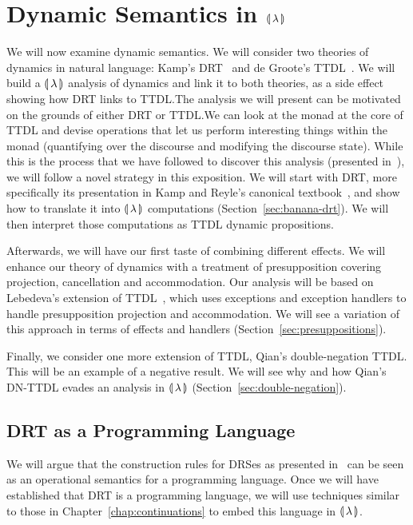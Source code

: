 \chapter{Dynamic Semantics in \texorpdfstring{$\llparenthesis \, \lambda \, \rrparenthesis$}{Our Calculus}}
\label{chap:dynamic-semantics}

We will now examine dynamic semantics. We will consider two theories of
dynamics in natural language: Kamp's DRT~\cite{kamp1993discourse} and de
Groote's TTDL~\cite{de2006towards}. We will build a $\llparenthesis \, \lambda \, \rrparenthesis$
analysis of dynamics and link it to both theories, as a side effect showing
how DRT links to TTDL.\@ The analysis we will present can be motivated on
the grounds of either DRT or TTDL.\@ We can look at the monad at the core
of TTDL and devise operations that let us perform interesting things within
the monad (quantifying over the discourse and modifying the discourse
state). While this is the process that we have followed to discover this
analysis (presented in~\cite{marsik2014algebraic}), we will follow a novel
strategy in this exposition. We will start with DRT, more specifically its
presentation in Kamp and Reyle's canonical
textbook~\cite{kamp1993discourse}, and show how to translate it into
$\llparenthesis \, \lambda \, \rrparenthesis$ computations (Section~\ref{sec:banana-drt}). We will
then interpret those computations as TTDL dynamic propositions.

Afterwards, we will have our first taste of combining different effects. We
will enhance our theory of dynamics with a treatment of presupposition
covering projection, cancellation and accommodation. Our analysis will be
based on Lebedeva's extension of TTDL~\cite{lebedeva2012expression}, which
uses exceptions and exception handlers to handle presupposition projection
and accommodation. We will see a variation of this approach in terms of
effects and handlers (Section~\ref{sec:presuppositions}).

Finally, we consider one more extension of TTDL, Qian's double-negation
TTDL. This will be an example of a negative result. We will see why and how
Qian's DN-TTDL evades an analysis in ${\llparenthesis \, \lambda \, \rrparenthesis}$
(Section~\ref{sec:double-negation}).

\minitoc


\section{DRT as a Programming Language}
\label{sec:drt-as-pl}

We will argue that the construction rules for DRSes as presented
in~\cite{kamp1993discourse} can be seen as an operational semantics for a
programming language. Once we will have established that DRT is a
programming language, we will use techniques similar to those in
Chapter~\ref{chap:continuations} to embed this language in
$\llparenthesis \, \lambda \, \rrparenthesis$.

